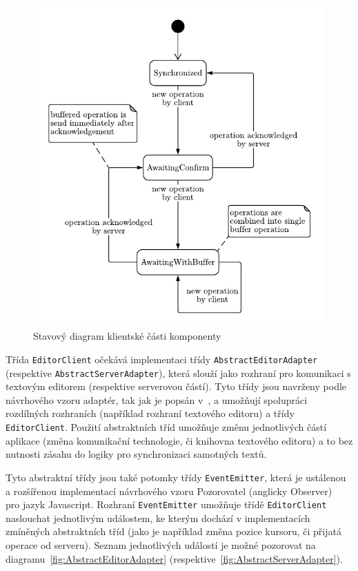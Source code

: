 \begin{figure}[ht!]
    \centering
    \includegraphics[width=\textwidth]{partials/navrh/editor/stavovyDiagram.pdf}
    \caption{Stavový diagram klientské části komponenty}\label{fig:stavovyDiagram}
\end{figure}

Třída \texttt{EditorClient} očekává implementaci třídy \texttt{AbstractEditorAdapter} (respektive \texttt{AbstractServerAdapter}), která slouží jako rozhraní pro komunikaci s textovým editorem (respektive serverovou částí).
Tyto třídy jsou navrženy podle návrhového vzoru adaptér, tak jak je popsán v~\cite[str.~135]{gof:patterns}, a umožňují spolupráci rozdílných rozhraních (například rozhraní textového editoru) a třídy \texttt{EditorClient}.
Použití abstraktních tříd umožňuje změnu jednotlivých částí aplikace (změna komunikační technologie, či knihovna textového editoru) a to bez nutnosti zásahu do logiky pro synchronizaci samotných textů.

Tyto abstraktní třídy jsou také potomky třídy \texttt{EventEmitter}, která je ustálenou a rozšířenou implementací návrhového vzoru Pozorovatel (anglicky Observer)~\cite[str.~273]{gof:patterns} pro jazyk Javascript.
Rozhraní \texttt{EventEmitter} umožňuje třídě \texttt{EditorClient} naslouchat jednotlivým událostem, ke kterým dochází v implementacích zmíněných abstraktních tříd (jako je například změna pozice kursoru, či přijatá operace od serveru).
Seznam jednotlivých událostí je možné pozorovat na diagramu~\ref{fig:AbstractEditorAdapter} (respektive~\ref{fig:AbstractServerAdapter}).

